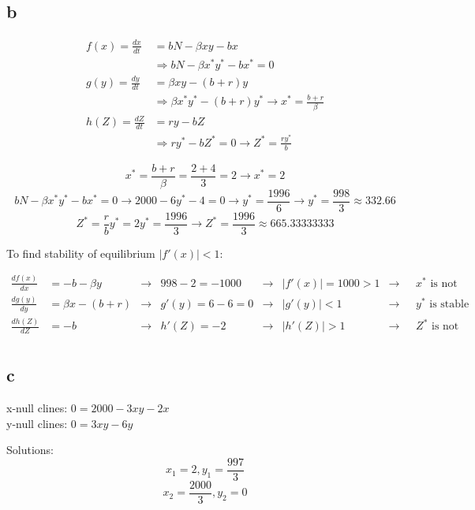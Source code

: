 \subsection{b}

\begin{align*}
f(x) = \frac{dx}{dt} &= bN-\beta xy - bx \\
&\Rightarrow bN - \beta x^* y^* -bx^* = 0 \\
g(y) = \frac{dy}{dt} &= \beta xy - (b+r)y \\
&\Rightarrow \beta x^* y^* - (b+r)y^* \rightarrow x^* = \frac{b+r}{\beta}\\
h(Z) = \frac{dZ}{dt} &= ry - bZ \\
 &\Rightarrow ry^* - bZ^* = 0 \rightarrow Z^* = \frac{ry^*}{b}
\end{align*}

\[ x^* = \frac{b+r}{\beta}  = \frac{2+4}{3} = 2 \rightarrow \boxed{x^* = 2}\]
\[ bN - \beta x^* y^*-bx^* = 0 \rightarrow 2000 -6y^* -4 = 0 \rightarrow y^* = \frac{1996}{6} \rightarrow \boxed{y^*= \frac{998}{3} \approx 332.66} \]
\[ Z^* = \frac{r}{b}y^* = 2y^* = \frac{1996}{3} \rightarrow \boxed{Z^* = \frac{1996}{3} \approx  665.33333333} \]

To find stability of equilibrium $|f'(x)| < 1$:

\begin{align*}
\frac{df(x)}{dx} &= -b-\beta y &\rightarrow& 998-2 = -1000 &\rightarrow&  |f'(x)| = 1000>1 &\rightarrow& \text{ $x^*$ is not stable} \\
\frac{dg(y)}{dy} &= \beta x - (b+r) &\rightarrow& g'(y) = 6-6 = 0 &\rightarrow&  |g'(y)| < 1 &\rightarrow& \text{ $y^*$ is stable}\\
\frac{dh(Z)}{dZ} &= - b &\rightarrow& h'(Z) = -2 &\rightarrow& |h'(Z)| > 1 &\rightarrow&   \text{ $Z^*$ is not stable} \\
\end{align*}

\subsection{c}

x-null clines: $ 0 = 2000 -3xy -2x$\\
y-null clines: $ 0 = 3xy -6y$ 

Solutions:
\[x_1 = 2, y_1 = \frac{997}{3}\]
\[x_2 = \frac{2000}{3}, y_2 = 0\]

